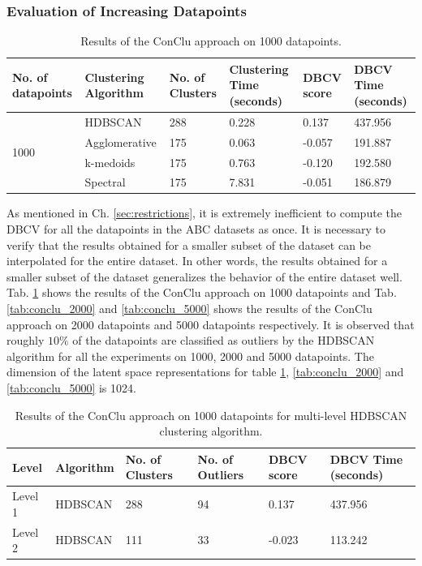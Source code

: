 \subsubsection{Evaluation of Increasing Datapoints}
\label{sec:conclu_with_inc_data}
\begin{table}[H]
  \setlength\extrarowheight{10pt}
  \caption{Results of the ConClu approach on 1000 datapoints. }
  \centering
  \begin{tabular}{|p{50pt}|p{60pt}|p{50pt}|p{40pt}|p{50pt}|p{40pt}|}
    \toprule
    No. of datapoints & Clustering Algorithm & No. of Clusters & Clustering Time (seconds) & \ac{DBCV} score & \ac{DBCV} Time (seconds)\\
    \midrule
    \multirow{4}{1.0in}{1000} & \ac{HDBSCAN}	& 288	& 0.228 & 0.137	& 437.956 \\ \cline{2-6} 
                              & Agglomerative	& 175	& 0.063 & -0.057	& 191.887 \\ \cline{2-6} 
                              & k-medoids	& 175	& 0.763 & -0.120 	& 192.580 \\ \cline{2-6}
                              & Spectral	& 175	& 7.831 & -0.051	& 186.879 \\ 
    \bottomrule
  \end{tabular}
  \label{tab:conclu_1000}
\end{table}
As mentioned in Ch. \ref{sec:restrictions}, it is extremely inefficient to compute the \ac{DBCV} for all the datapoints in the ABC datasets \cite{Koch_2019_CVPR} as once. It is necessary to verify that the results obtained for a smaller subset of the dataset can be interpolated for the entire dataset. In other words, the results obtained for a smaller subset of the dataset generalizes the behavior of the entire dataset well. Tab. \ref{tab:conclu_1000} shows the results of the ConClu approach on 1000 datapoints and Tab. \ref{tab:conclu_2000}  and \ref{tab:conclu_5000} shows the results of the ConClu approach on 2000 datapoints and 5000 datapoints respectively. It is observed that roughly $10\%$ of the datapoints are classified as outliers by the \ac{HDBSCAN} algorithm for all the experiments on 1000, 2000 and 5000 datapoints. The dimension of the latent space representations for table
\ref{tab:conclu_1000}, \ref{tab:conclu_2000} and \ref{tab:conclu_5000} is 1024. 

\begin{table}[H]
  \setlength\extrarowheight{10pt}
  \caption{Results of the ConClu approach on 1000 datapoints for multi-level \ac{HDBSCAN} clustering algorithm. }
  \centering
  \begin{tabular}{|l|l|l|l|l|p{40pt}|}
    \toprule
    Level & Algorithm	& No. of Clusters	& No. of Outliers	& DBCV score	& DBCV Time (seconds)	\\  
    \midrule
    Level 1 & \ac{HDBSCAN}	& 288	& 94	& 0.137	& 437.956 \\ \cline{1-6}
    Level 2 & \ac{HDBSCAN}	& 111	& 33	& -0.023	& 113.242 \\ 

    \bottomrule
  \end{tabular}
  \label{tab:conclu_1000_levels}
\end{table}

